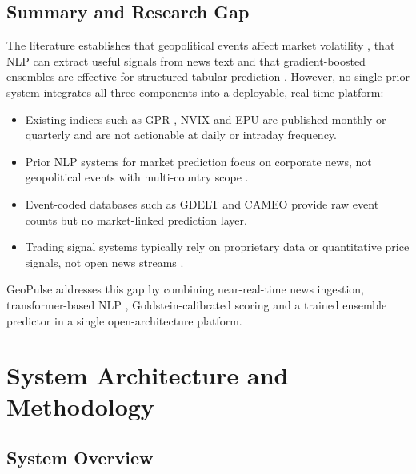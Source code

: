 \documentclass[12pt,a4paper]{report}
\begin{document}
\section{Summary and Research Gap}

The literature establishes that geopolitical events affect market volatility
\cite{caldara2022, bloom2009}, that NLP can extract useful signals from news
text \cite{tetlock2007, nassirtoussi2014, bollen2011} and that gradient-boosted
ensembles are effective for structured tabular prediction \cite{chen2016,
ke2017, prokhorenkova2018}. However, no single prior system integrates all
three components into a deployable, real-time platform:

\begin{itemize}
  \item Existing indices such as GPR \cite{caldara2022}, NVIX \cite{manela2017}
        and EPU \cite{baker2016} are published monthly or quarterly and are
        not actionable at daily or intraday frequency.
  \item Prior NLP systems for market prediction focus on corporate news,
        not geopolitical events with multi-country scope \cite{nassirtoussi2014}.
  \item Event-coded databases such as GDELT \cite{leetaru2013} and CAMEO
        \cite{schrodt2012} provide raw event counts but no market-linked
        prediction layer.
  \item Trading signal systems typically rely on proprietary data or
        quantitative price signals, not open news streams \cite{manela2017}.
\end{itemize}

GeoPulse addresses this gap by combining near-real-time news ingestion,
transformer-based NLP \cite{lewis2020, devlin2019}, Goldstein-calibrated
scoring \cite{goldstein1992} and a trained ensemble predictor
\cite{ke2017, chen2016, prokhorenkova2018} in a single open-architecture
platform.

\chapter{System Architecture and Methodology}
\label{ch:sysarch}

\section{System Overview}
\end{document}
